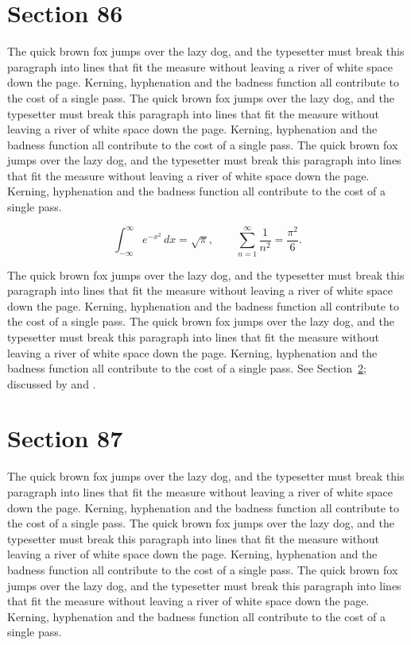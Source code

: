 \documentclass{article}
\begin{document}
\section{Section 86}
\label{sec:86}
The quick brown fox jumps over the lazy dog, and the typesetter must break this paragraph into lines that fit the measure without leaving a river of white space down the page. Kerning, hyphenation and the badness function all contribute to the cost of a single pass. The quick brown fox jumps over the lazy dog, and the typesetter must break this paragraph into lines that fit the measure without leaving a river of white space down the page. Kerning, hyphenation and the badness function all contribute to the cost of a single pass. The quick brown fox jumps over the lazy dog, and the typesetter must break this paragraph into lines that fit the measure without leaving a river of white space down the page. Kerning, hyphenation and the badness function all contribute to the cost of a single pass. 

\begin{equation}\label{eq:86}
\int_{-\infty}^{\infty} e^{-x^{2}}\,dx = \sqrt{\pi}, \qquad
\sum_{n=1}^{\infty} \frac{1}{n^{2}} = \frac{\pi^{2}}{6}.
\end{equation}

The quick brown fox jumps over the lazy dog, and the typesetter must break this paragraph into lines that fit the measure without leaving a river of white space down the page. Kerning, hyphenation and the badness function all contribute to the cost of a single pass. The quick brown fox jumps over the lazy dog, and the typesetter must break this paragraph into lines that fit the measure without leaving a river of white space down the page. Kerning, hyphenation and the badness function all contribute to the cost of a single pass. 
See Section~\ref{sec:87}; discussed by \textcite{k2} and \textcite{l4}.
\section{Section 87}
\label{sec:87}
The quick brown fox jumps over the lazy dog, and the typesetter must break this paragraph into lines that fit the measure without leaving a river of white space down the page. Kerning, hyphenation and the badness function all contribute to the cost of a single pass. The quick brown fox jumps over the lazy dog, and the typesetter must break this paragraph into lines that fit the measure without leaving a river of white space down the page. Kerning, hyphenation and the badness function all contribute to the cost of a single pass. The quick brown fox jumps over the lazy dog, and the typesetter must break this paragraph into lines that fit the measure without leaving a river of white space down the page. Kerning, hyphenation and the badness function all contribute to the cost of a single pass. 
\end{document}

